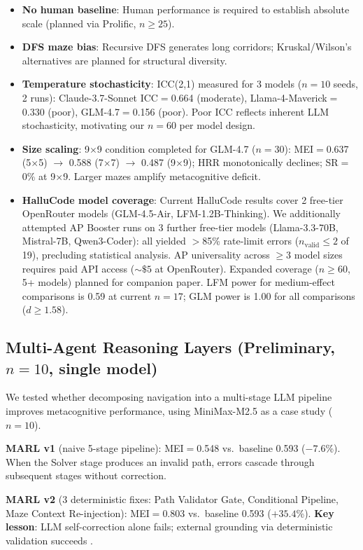 \documentclass{article}
\begin{document}
\begin{itemize}[nosep]
  \item \textbf{No human baseline}: Human performance is required to establish absolute scale (planned via Prolific, $n{\geq}25$).
  \item \textbf{DFS maze bias}: Recursive DFS generates long corridors; Kruskal/Wilson's alternatives are planned for structural diversity.
  \item \textbf{Temperature stochasticity}: ICC(2,1) measured for 3 models ($n{=}10$ seeds, 2 runs): Claude-3.7-Sonnet ICC$=$0.664 (moderate), Llama-4-Maverick$=$0.330 (poor), GLM-4.7$=$0.156 (poor). Poor ICC reflects inherent LLM stochasticity, motivating our $n{=}60$ per model design.
  \item \textbf{Size scaling}: 9$\times$9 condition completed for GLM-4.7 ($n{=}30$): MEI$=$0.637 (5$\times$5) $\to$ 0.588 (7$\times$7) $\to$ 0.487 (9$\times$9); HRR monotonically declines; SR$=$0\% at 9$\times$9. Larger mazes amplify metacognitive deficit.
  \item \textbf{HalluCode model coverage}: Current HalluCode results cover 2 free-tier OpenRouter models (GLM-4.5-Air, LFM-1.2B-Thinking). We additionally attempted AP Booster runs on 3 further free-tier models (Llama-3.3-70B, Mistral-7B, Qwen3-Coder): all yielded $>$85\% rate-limit errors ($n_{\text{valid}}{\leq}2$ of 19), precluding statistical analysis. AP universality across $\geq$3 model sizes requires paid API access (${\sim}\$5$ at OpenRouter). Expanded coverage ($n{\geq}60$, 5+ models) planned for companion paper. LFM power for medium-effect comparisons is 0.59 at current $n{=}17$; GLM power is 1.00 for all comparisons ($d{\geq}1.58$).
\end{itemize}

\subsection{Multi-Agent Reasoning Layers \textnormal{\small(Preliminary, $n{=}10$, single model)}}

We tested whether decomposing navigation into a multi-stage LLM pipeline improves metacognitive performance, using MiniMax-M2.5 as a case study ($n{=}10$).

\textbf{MARL v1} (naive 5-stage pipeline): MEI$=$0.548 vs.\ baseline 0.593 ($-7.6$\%).
When the Solver stage produces an invalid path, errors cascade through subsequent stages without correction.

\textbf{MARL v2} (3 deterministic fixes: Path Validator Gate, Conditional Pipeline, Maze Context Re-injection): MEI$=$0.803 vs.\ baseline 0.593 ($+35.4$\%).
\textbf{Key lesson}: LLM self-correction alone fails; external grounding via deterministic validation succeeds \citep{huang2024selfcorrect, shinn2023reflexion}.
\end{document}
